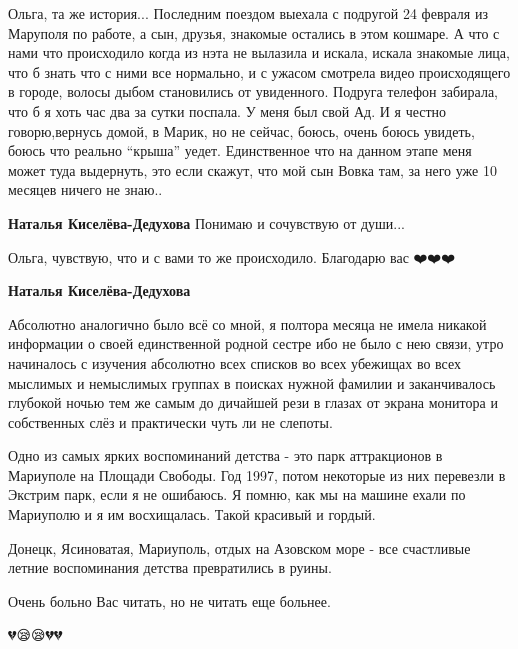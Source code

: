 \begin{itemize} %

Ольга, та же история... Последним поездом выехала с подругой 24 февраля из
Маруполя по работе, а сын, друзья, знакомые остались в этом кошмаре. А что с
нами что происходило когда из нэта не вылазила и искала, искала знакомые лица,
что б знать что с ними все нормально, и с ужасом смотрела видео происходящего в
городе, волосы дыбом становились от увиденного. Подруга телефон забирала, что б
я хоть час два за сутки поспала. У меня был свой Ад. И я честно говорю,вернусь
домой, в Марик, но не сейчас, боюсь, очень боюсь увидеть, боюсь что реально
\enquote{крыша} уедет. Единственное что на данном этапе меня может туда выдернуть, это
если скажут, что мой сын Вовка там, за него уже 10 месяцев ничего не знаю..

\textbf{Наталья Киселёва-Дедухова} Понимаю и сочувствую от души...


Ольга, чувствую, что и с вами то же происходило. Благодарю вас ❤️❤️❤️

\textbf{Наталья Киселёва-Дедухова} 

Абсолютно аналогично было всё со мной, я полтора месяца не имела никакой
информации о своей единственной родной сестре ибо не было с нею связи, утро
начиналось с изучения абсолютно всех списков во всех убежищах во всех мыслимых
и немыслимых группах в поисках нужной фамилии и заканчивалось глубокой ночью
тем же самым до дичайшей рези в глазах от экрана монитора и собственных слёз и
практически чуть ли не слепоты.

\end{itemize} %


Одно из самых ярких воспоминаний детства - это парк аттракционов в Мариуполе на
Площади Свободы. Год 1997, потом некоторые из них перевезли в Экстрим парк,
если я не ошибаюсь. Я помню, как мы на машине ехали по Мариуполю и я им
восхищалась. Такой красивый и гордый.

Донецк, Ясиноватая, Мариуполь, отдых на Азовском море - все счастливые летние
воспоминания детства превратились в руины.

Очень больно Вас читать, но не читать еще больнее.


💔😪😪💔💔


